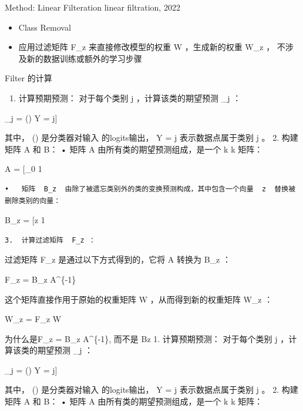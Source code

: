 \documentclass[
  ignorenonframetext,
  aspectratio=169,
]{beamer}
\providecommand{\tightlist}{%
  \setlength{\itemsep}{0pt}\setlength{\parskip}{0pt}}\usepackage{longtable,booktabs,array}
\begin{document}
\begin{frame}[fragile]{Method: Linear Filteration}
\label{method-linear-filteration}
linear filtration, 2022

\begin{itemize}
\tightlist
\item
  Class Removal
\item
  应用过滤矩阵 F\_z 来直接修改模型的权重 W ，生成新的权重 W\_z ，
  不涉及新的数据训练或额外的学习步骤
\end{itemize}

Filter 的计算

\begin{enumerate}
\tightlist
\item
  计算预期预测： 对于每个类别 j ，计算该类的期望预测 \_j ：
\end{enumerate}

\_j = \mathbb{E}{[}() \textbar{} Y = j{]}

其中， () 是分类器对输入  的logits输出， Y
= j 表示数据点属于类别 j 。 2. 构建矩阵 A 和 B： • 矩阵 A
由所有类的期望预测组成，是一个 k \times k 矩阵：

A = {[}\_0 \textbar{} 1 \textbar{} \cdots \textbar{}
\mathbf{a}{k-1}{]}

\begin{verbatim}
•   矩阵  B_z  由除了被遗忘类别外的类的变换预测构成，其中包含一个向量  z  替换被删除类别的向量：
\end{verbatim}

B\_z = {[}z \textbar{} 1 \textbar{} \cdots \textbar{}
\mathbf{a}{k-1}{]}

\begin{verbatim}
3.  计算过滤矩阵  F_z ：
\end{verbatim}

过滤矩阵 F\_z 是通过以下方式得到的，它将 A 转换为 B\_z ：

F\_z = B\_z A\^{}\{-1\}

这个矩阵直接作用于原始的权重矩阵 W ，从而得到新的权重矩阵 W\_z ：

W\_z = F\_z W

为什么是F\_z = B\_z A\^{}\{-1\}, 而不是 Bz 1. 计算预期预测：
对于每个类别 j ，计算该类的期望预测 \_j ：

\_j = \mathbb{E}{[}() \textbar{} Y = j{]}

其中， () 是分类器对输入  的logits输出， Y
= j 表示数据点属于类别 j 。 2. 构建矩阵 A 和 B： • 矩阵 A
由所有类的期望预测组成，是一个 k \times k 矩阵：


\end{frame}
\end{document}

